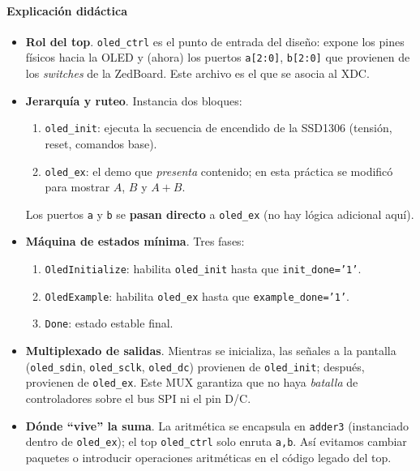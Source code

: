 \documentclass[a4paper,12pt]{article}
\begin{document}
\paragraph{Explicación didáctica}
\begin{itemize}
  \item \textbf{Rol del top}. \texttt{oled\_ctrl} es el punto de entrada del diseño: expone los pines físicos hacia la OLED y (ahora) los puertos \texttt{a[2:0]}, \texttt{b[2:0]} que provienen de los \emph{switches} de la ZedBoard. Este archivo es el que se asocia al XDC.
  \item \textbf{Jerarquía y ruteo}. Instancia dos bloques:
  \begin{enumerate}
    \item \texttt{oled\_init}: ejecuta la secuencia de encendido de la SSD1306 (tensión, reset, comandos base).
    \item \texttt{oled\_ex}: el demo que \emph{presenta} contenido; en esta práctica se modificó para mostrar \(A\), \(B\) y \(A{+}B\).
  \end{enumerate}
  Los puertos \texttt{a} y \texttt{b} se \textbf{pasan directo} a \texttt{oled\_ex} (no hay lógica adicional aquí).
  \item \textbf{Máquina de estados mínima}. Tres fases:
  \begin{enumerate}
    \item \texttt{OledInitialize}: habilita \texttt{oled\_init} hasta que \texttt{init\_done='1'}.
    \item \texttt{OledExample}: habilita \texttt{oled\_ex} hasta que \texttt{example\_done='1'}.
    \item \texttt{Done}: estado estable final.
  \end{enumerate}
  \item \textbf{Multiplexado de salidas}. Mientras se inicializa, las señales a la pantalla (\texttt{oled\_sdin}, \texttt{oled\_sclk}, \texttt{oled\_dc}) provienen de \texttt{oled\_init}; después, provienen de \texttt{oled\_ex}. Este MUX garantiza que no haya \emph{batalla} de controladores sobre el bus SPI ni el pin D/C.
  \item \textbf{Dónde “vive” la suma}. La aritmética se encapsula en \texttt{adder3} (instanciado dentro de \texttt{oled\_ex}); el top \texttt{oled\_ctrl} solo enruta \texttt{a,b}. Así evitamos cambiar paquetes o introducir operaciones aritméticas en el código legado del top.

\end{itemize}
\end{document}
